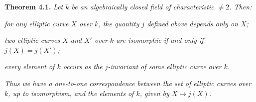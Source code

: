 {\medskip
\noindent\hypertarget{result-IV-4.1}{}\textbf{Theorem 4.1.} \emph{Let $k$ be an algebraically closed field of characteristic $\ne2$. Then:}
\begin{parts}
\item\hypertarget{result-IV-4.1a}{} \emph{for any elliptic curve $X$ over $k$, the quantity $j$ defined above depends only on $X$;}
\item\hypertarget{result-IV-4.1b}{} \emph{two elliptic curves $X$ and $X'$ over $k$ are isomorphic if and only if $j(X)=j(X')$;}
\item\hypertarget{result-IV-4.1c}{} \emph{every element of $k$ occurs as the $j$-invariant of some elliptic curve over $k$.}
\end{parts}
\emph{Thus we have a one-to-one correspondence between the set of elliptic curves over $k$, up to isomorphism, and the elements of $k$, given by $X\mapsto j(X)$.}
}
